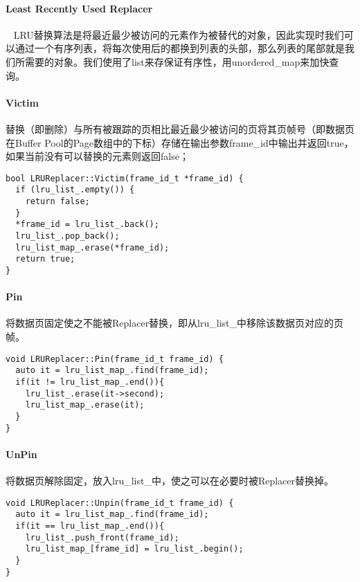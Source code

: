 \documentclass[12pt,hyperref,a4paper,UTF8]{ctexart}
\begin{document}
\paragraph{Least Recently Used Replacer}~{}
LRU替换算法是将最近最少被访问的元素作为被替代的对象，因此实现时我们可以通过一个有序列表，将每次使用后的都换到列表的头部，那么列表的尾部就是我们所需要的对象。我们使用了list来存保证有序性，用unordered\_map来加快查询。

\paragraph{Victim} 
替换（即删除）与所有被跟踪的页相比最近最少被访问的页将其页帧号（即数据页在Buffer Pool的Page数组中的下标）存储在输出参数frame\_id中输出并返回true，如果当前没有可以替换的元素则返回false；
\begin{verbatim}
bool LRUReplacer::Victim(frame_id_t *frame_id) {
  if (lru_list_.empty()) {
    return false;
  }
  *frame_id = lru_list_.back();
  lru_list_.pop_back();
  lru_list_map_.erase(*frame_id);
  return true;
}
\end{verbatim}

\paragraph{Pin}
将数据页固定使之不能被Replacer替换，即从lru\_list\_中移除该数据页对应的页帧。
\begin{verbatim}
void LRUReplacer::Pin(frame_id_t frame_id) {
  auto it = lru_list_map_.find(frame_id);
  if(it != lru_list_map_.end()){
    lru_list_.erase(it->second);
    lru_list_map_.erase(it);
  }
}
\end{verbatim}

\paragraph{UnPin}
将数据页解除固定，放入lru\_list\_中，使之可以在必要时被Replacer替换掉。
\begin{verbatim}
void LRUReplacer::Unpin(frame_id_t frame_id) {
  auto it = lru_list_map_.find(frame_id);
  if(it == lru_list_map_.end()){
    lru_list_.push_front(frame_id);
    lru_list_map_[frame_id] = lru_list_.begin();
  }
}
\end{verbatim}
\end{document}
